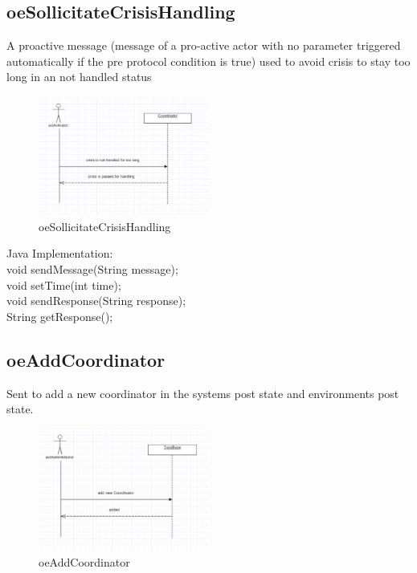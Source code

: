 \subsection{oeSollicitateCrisisHandling}
A proactive message (message of a pro-active actor with no parameter triggered
automatically if the pre protocol condition is true) used to avoid crisis to
stay too long in an not handled status\\
\begin{figure}[H]
\begin{center}
\includegraphics[width=0.5\textwidth]{./images/oeSollicitateCrisisHandling.eps} 
\end{center}
\caption{oeSollicitateCrisisHandling}
\end{figure}

\noindent Java Implementation:\\
void sendMessage(String message);\\
void setTime(int time);\\
void sendResponse(String response);\\
String getResponse();\\

\subsection{oeAddCoordinator}
Sent to add a new coordinator in the systems post state and environments post
state.\\
\begin{figure}[H]
\begin{center}
\includegraphics[width=0.5\textwidth]{./images/oeAddCoordinator.eps} 
\end{center}
\caption{oeAddCoordinator}
\end{figure}

